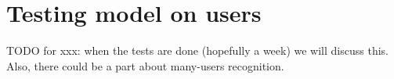 
\section{Testing model on users}

TODO for xxx: when the tests are done (hopefully a week) we will discuss this. Also, there could be a part about many-users recognition.
